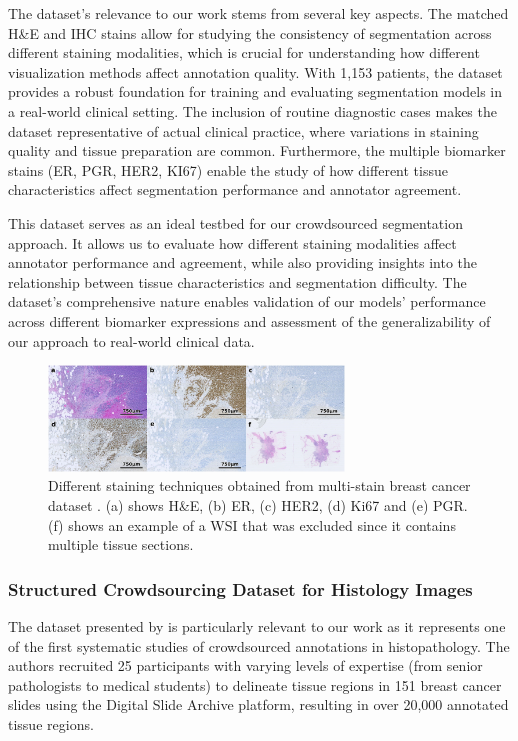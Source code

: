 The dataset's relevance to our work stems from several key aspects.
The matched H\&E and IHC stains allow for studying the consistency of
segmentation across different staining modalities, which is crucial
for understanding how different visualization methods affect
annotation quality. With 1,153 patients, the dataset provides a
robust foundation for training and evaluating segmentation models in
a real-world clinical setting. The inclusion of routine diagnostic
cases makes the dataset representative of actual clinical practice,
where variations in staining quality and tissue preparation are
common. Furthermore, the multiple biomarker stains (ER, PGR, HER2,
KI67) enable the study of how different tissue characteristics affect
segmentation performance and annotator agreement.

This dataset serves as an ideal testbed for our crowdsourced
segmentation approach. It allows us to evaluate how different
staining modalities affect annotator performance and agreement, while
also providing insights into the relationship between tissue
characteristics and segmentation difficulty. The dataset's
comprehensive nature enables validation of our models' performance
across different biomarker expressions and assessment of the
generalizability of our approach to real-world clinical data.

\begin{figure}[h]
  \centering
  \includegraphics[width=0.7\textwidth]{Cap2/Figures/staining_comparison.png}
  \caption{Different staining techniques obtained from multi-stain
    breast cancer dataset \cite{WeitzEtAl2023}. (a) shows H\&E, (b) ER,
    (c) HER2, (d) Ki67 and (e) PGR. (f) shows an example of a \gls{WSI}
  that was excluded since it contains multiple tissue sections.}
  \label{fig:weitz_dataset_overview}
\end{figure}

\subsubsection{Structured Crowdsourcing Dataset for Histology Images}

The dataset presented by \cite{AmgadEtAl2019} is particularly
relevant to our work as it represents one of the first systematic
studies of crowdsourced annotations in histopathology. The authors
recruited 25 participants with varying levels of expertise (from
senior pathologists to medical students) to delineate tissue regions
in 151 breast cancer slides using the Digital Slide Archive platform,
resulting in over 20,000 annotated tissue regions.

